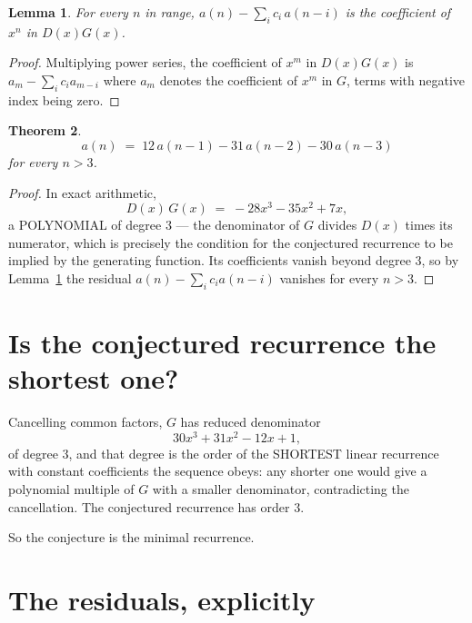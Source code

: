 \documentclass[11pt,a4paper]{article}
\theoremstyle{plain}
\newtheorem{theorem}{Theorem}
\newtheorem{lemma}[theorem]{Lemma}
\theoremstyle{definition}
\begin{document}
\begin{lemma}\label{lem:key}
For every $n$ in range, $a(n)-\sum_i c_i\,a(n-i)$ is the coefficient of $x^{n}$ in
$D(x)G(x)$.
\end{lemma}

\begin{proof}
Multiplying power series, the coefficient of $x^{m}$ in $D(x)G(x)$ is
$a_m-\sum_i c_i a_{m-i}$ where $a_m$ denotes the coefficient of $x^{m}$ in $G$, terms with
negative index being zero.
\end{proof}

\begin{theorem}
\[
a(n)\;=\;12\,a(n-1) - 31\,a(n-2) - 30\,a(n-3)
\]
for every $n>3$.
\end{theorem}

\begin{proof}
In exact arithmetic,
\[
D(x)\,G(x)\;=\;- 28 x^{3} - 35 x^{2} + 7 x,
\]
a POLYNOMIAL of degree $3$ --- the denominator of $G$ divides $D(x)$ times its numerator,
which is precisely the condition for the conjectured recurrence to be implied by the
generating function. Its coefficients vanish beyond degree $3$, so by
Lemma~\ref{lem:key} the residual $a(n)-\sum_ic_ia(n-i)$ vanishes for every
$n>3$.
\end{proof}

\section{Is the conjectured recurrence the shortest one?}

Cancelling common factors, $G$ has reduced denominator
\[
30 x^{3} + 31 x^{2} - 12 x + 1,
\]
of degree $3$, and that degree is the order of the SHORTEST linear recurrence with
constant coefficients the sequence obeys: any shorter one would give a polynomial multiple of
$G$ with a smaller denominator, contradicting the cancellation. The conjectured recurrence has
order $3$.

So the conjecture is the minimal recurrence.

\section{The residuals, explicitly}
\end{document}
